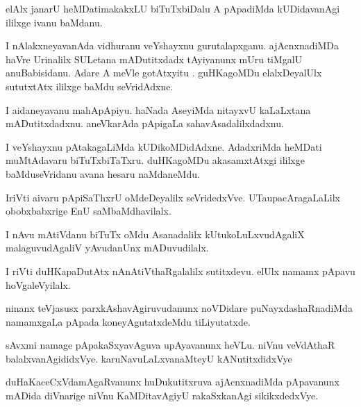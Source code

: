 \documentclass{article}
\begin{document}
\begin{mn}%
elAlx janarU heMDatimakakxLU biTuTxbiDalu A pApadiMda kUDidavanAgi ililxge ivanu baMdanu.
\end{mn}

\begin{mn}%
I nAlakxneyavanAda vidhuranu veYshayxnu gurutalapxganu. ajAcnxnadiMDa haVre Urinalilx 
SULetana mADutitxdadx tAyiyanunx mUru tiMgalU anuBabisidanu. Adare A meVle gotAtxyitu .
guHKagoMDu elalxDeyalUlx sututxtAtx ililxge baMdu seVridAdxne.
\end{mn}

\begin{mn}%
I aidaneyavanu mahApApiyu. haNada AseyiMda nitayxvU kaLaLxtana mADutitxdadxnu. aneVkarAda 
pApigaLa sahavAsadalilxdadxnu.
\end{mn}

\begin{mn}%
I veYshayxnu pAtakagaLiMda kUDikoMDidAdxne. AdadxriMda heMDati muMtAdavaru biTuTxbiTaTxru. 
duHKagoMDu akasamxtAtxgi ililxge baMduseVridanu avana hesaru naMdaneMdu.
\end{mn}

\begin{mn}%
IriVti aivaru pApiSaThxrU oMdeDeyalilx seVridedxVve. UTaupacAragaLaLilx obobxbabxrige EnU 
saMbaMdhavilalx.
\end{mn}

\begin{mn}%
I nAvu mAtiVdanu biTuTx oMdu Asanadalilx kUtukoLuLxvudAgaliX malaguvudAgaliV yAvudanUnx 
mADuvudilalx.
\end{mn}

\begin{mn}%
I riVti duHKapaDutAtx nAnAtiVthaRgalalilx sutitxdevu. elUlx namamx pApavu hoVgaleVyilalx.
\end{mn}

\begin{mn}%
ninanx teVjasusx parxkAshavAgiruvudanunx noVDidare puNayxdashaRnadiMda namamxgaLa pApada 
koneyAgutatxdeMdu tiLiyutatxde.
\end{mn}

\begin{mn}%
sAvxmi namage pApakaSxyavAguva upAyavanunx heVLu. niVnu veVdAthaR balalxvanAgididxVye. 
karuNavuLaLxvanaMteyU kANutitxdidxVye
\end{mn}

\begin{mn}%
duHaKaceCxVdamAgaRvanunx huDukutitxruva ajAcnxnadiMda pApavanunx mADida diVnarige niVnu 
KaMDitavAgiyU rakaSxkanAgi sikikxdedxVye.
\end{mn}
\end{document}
